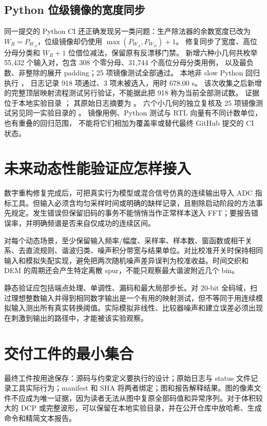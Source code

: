 

\subsection{Python 位级镜像的宽度同步}

同一提交的 Python CI 还正确发现另一类问题：生产除法器的余数宽度已改为
\(W_R=P_{W_A}\)，位级镜像却仍使用 \(\max(P_{W_A},P_{W_D})+1\)。
修复同步了宽度、高位分母分类和 \(W_R+1\) 位借位减法，保留原有反漂移门禁。
新增六种小几何共枚举 55,432 个输入对，包含 308 个零分母、31,744 个高位分母分类用例，
以及最负数、非整除的展开 padding；25 项镜像测试全部通过。
本地非 slow Python 回归执行 ，
日志记录 918 项通过、3 项未被选入，用时 678.00 s。
该次收集之后新增的完整顶层映射流程测试另行验证，不能据此把 918 称为当前全部测试数。
证据位于本地实验目录 ；
其原始日志摘要为 。
六个小几何的独立复核及 25 项镜像测试另见同一实验目录的
。
镜像用例、Python 测试与 RTL 向量有不同计数单位，也有重叠的回归范围，
不能将它们相加为覆盖率或替代最终 GitHub 提交的 CI 状态。

\section{未来动态性能验证应怎样接入}
数字重构修复完成后，可把真实行为模型或混合信号仿真的连续输出导入 ADC 指标工具。但输入必须含均匀采样时间或明确的缺样记录，且剔除启动阶段的方法事先规定。发生错误但保留旧码的事务不能悄悄当作正常样本送入 FFT；要报告错误率，并明确频谱是否来自仅成功的连续区间。

对每个动态场景，至少保留输入频率/幅度、采样率、样本数、窗函数或相干关系、去直流规则、谐波归类、噪声积分带宽与结果单位。对比校准开关时保持相同输入和模拟失配实现，避免把两次随机噪声差异误判为校准收益。时间交织和 DEM 的周期还会产生特定离散 spur，不能只观察最大谐波附近几个 bin。

静态验证应包括端点处理、单调性、漏码和最大局部步长。对 20-bit 全码域，扫过理想整数输入并得到相同数字输出是一个有用的映射测试，但不等同于用连续模拟输入测出所有真实转换阈值。实际模拟非线性、比较器噪声和建立误差必须出现在刺激到输出的路径中，才能被该实验观察。

\section{交付工件的最小集合}
最终工件按用途保存：源码与约束定义要执行的设计；原始日志与 status 文件记录工具实际行为；manifest 和 SHA 将两者绑定；图和报告解释结果。图的像素文件不应成为唯一证据，因为读者无法从图中复原全部码值和异常序列。对于体积较大的 DCP 或完整波形，可以保留在本地实验目录，并在公开仓库中放哈希、生成命令和精简文本报告。

